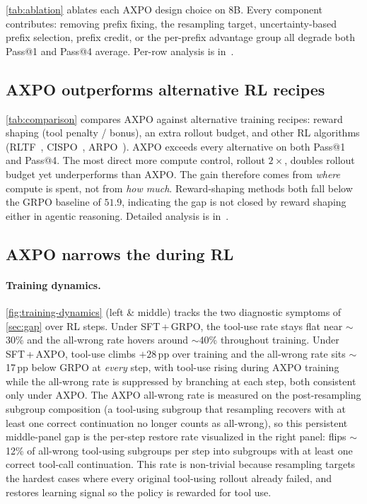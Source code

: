 \autoref{tab:ablation} ablates each AXPO design choice on 8B. Every component contributes: removing prefix fixing, the resampling target, uncertainty-based prefix selection, prefix credit, or the per-prefix advantage group all degrade both Pass@1 and Pass@4 average. Per-row analysis is in~.

\subsection{AXPO outperforms alternative RL recipes}
\label{sec:comparison}



\autoref{tab:comparison} compares AXPO against alternative training recipes: reward shaping (tool penalty / bonus), an extra rollout budget, and other RL algorithms (RLTF~\citep{rltf}, CISPO~\citep{cispo}, ARPO~\citep{arpo}). AXPO exceeds every alternative on both Pass@1 and Pass@4. The most direct more compute control, rollout $2\times$, doubles rollout budget yet underperforms than AXPO. The gain therefore comes from \emph{where} compute is spent, not from \emph{how much}. Reward-shaping methods both fall below the GRPO baseline of $51.9$, indicating the gap is not closed by reward shaping either in agentic reasoning. Detailed analysis is in~.

\subsection{AXPO narrows the \gap during RL}
\label{sec:dynamics}


\paragraph{Training dynamics.}
\autoref{fig:training-dynamics} (left \& middle) tracks the two diagnostic symptoms of \autoref{sec:gap} over RL steps. Under SFT\,+\,GRPO, the tool-use rate stays flat near $\sim$30\% and the all-wrong rate hovers around $\sim$40\% throughout training. Under SFT\,+\,AXPO, tool-use climbs $+28$\,pp over training and the all-wrong rate sits $\sim$17\,pp below GRPO at \emph{every} step, with tool-use rising during AXPO training while the all-wrong rate is suppressed by branching at each step, both consistent only under AXPO. The AXPO all-wrong rate is measured on the post-resampling subgroup composition (a tool-using subgroup that resampling recovers with at least one correct continuation no longer counts as all-wrong), so this persistent middle-panel gap is the per-step restore rate visualized in the right panel: \toolresample flips $\sim$12\% of all-wrong tool-using subgroups per step into subgroups with at least one correct tool-call continuation. This rate is non-trivial because resampling targets the hardest cases where every original tool-using rollout already failed, and restores learning signal so the policy is rewarded for tool use.

